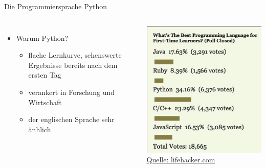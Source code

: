 \begin{frame}{Die Programmiersprache Python}
\begin{columns}
    \begin{itemize}
        \item Warum Python?
            \begin{itemize}
                \item flache Lernkurve, sehenswerte Ergebnisse bereits nach dem ersten Tag
                \item verankert in Forschung und Wirtschaft
                \item der englischen Sprache sehr änhlich
            \end{itemize}
    \end{itemize}
    \centering\includegraphics[scale=0.5]{images/best_lang} 
    \hyperlink{https://lifehacker.com/five-best-programming-languages-for-first-time-learners-1494256243}{\tiny{Quelle: lifehacker.com}}
\end{columns}
\end{frame}

